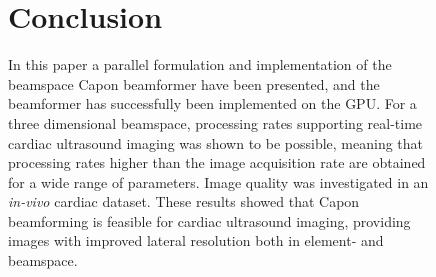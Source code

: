 \begin{figure}[!t]
\section{Conclusion}\label{II_sec:con}
In this paper a parallel formulation and implementation of the beamspace Capon beamformer have been presented, and
the beamformer has successfully been implemented on the GPU. For a three dimensional beamspace, processing rates supporting real-time cardiac ultrasound imaging was shown to be possible, meaning that processing rates higher than the image acquisition rate are obtained for a wide range of parameters. Image quality was investigated in an \textit{in-vivo} cardiac dataset. These results showed that Capon beamforming is feasible for cardiac ultrasound imaging, providing images with improved lateral resolution both in element- and beamspace.




%
%


\end{figure}
